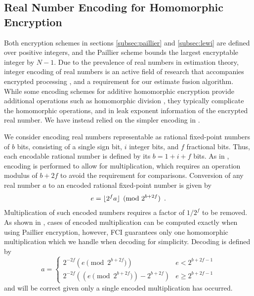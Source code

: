 \documentclass[letterpaper, 10 pt, journal, twoside]{ieeetran}  %
\begin{document}
\subsection{Real Number Encoding for Homomorphic Encryption} \label{subsec:encoding}
Both encryption schemes in sections \ref{subsec:paillier} and \ref{subsec:lewi} are defined over positive integers, and the Paillier scheme bounds the largest encryptable integer by $N-1$. Due to the prevalence of real numbers in estimation theory, integer encoding of real numbers is an active field of research that accompanies encrypted processing \cite{ziadCryptoImgPrivacyPreserving2016,farokhiSecurePrivateControl2017,cheonHomomorphicEncryptionArithmetic2017}, and a requirement for our estimate fusion algorithm. While some encoding schemes for additive homomorphic encryption provide additional operations such as homomorphic division \cite{ziadCryptoImgPrivacyPreserving2016}, they typically complicate the homomorphic operations, and in \cite{ziadCryptoImgPrivacyPreserving2016} leak exponent information of the encrypted real number. We have instead relied on the simpler encoding in \cite{farokhiSecurePrivateControl2017}. 

We consider encoding real numbers representable as rational fixed-point numbers of $b$ bits, consisting of a single sign bit, $i$ integer bits, and $f$ fractional bits. Thus, each encodable rational number is defined by its $b=1+i+f$ bits. As in \cite{farokhiSecurePrivateControl2017}, encoding is performed to allow for multiplication, which requires an operation modulus of $b+2f$ to avoid the requirement for comparisons. Conversion of any real number $a$ to an encoded rational fixed-point number is given by
\begin{equation}
   e = \lfloor{2^f a}\rfloor\pmod{2^{b + 2f}}\enspace. \label{eqn:qmn}
\end{equation}
Multiplication of such encoded numbers requires a factor of $1/2^f$ to be removed. As shown in \cite{farokhiSecurePrivateControl2017}, cases of encoded multiplication can be computed exactly when using Paillier encryption, however, FCI guarantees only one homomorphic multiplication which we handle when decoding for simplicity. Decoding is defined by
\begin{equation}
   a=
   \begin{cases}
      2^{-2f}\left(e \!\!\pmod{2^{b+2f}}\right) & e<2^{b+2f-1} \\
      2^{-2f}\left((e \!\!\pmod{2^{b+2f}}) - 2^{b+2f}\right) & e\geq 2^{b+2f-1}
   \end{cases} \label{eqn:qmn_mult_decode}
\end{equation}
and will be correct given only a single encoded multiplication has occurred.
\end{document}
